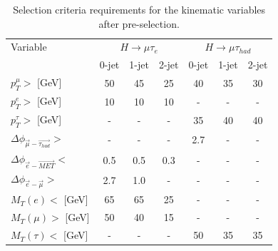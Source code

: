 \begin{table}[hbtp]
 \begin{center}
 \caption{Selection criteria requirements for the kinematic variables after pre-selection.}
  \label{tab:kinematicselection}
  \vspace{0.1in}
  \begin{tabular}{|l|c|c|c|c|c|c|} \hline
Variable                                      & \multicolumn{3}{c|}{$H \to \mu \tau_{e}$}                 &     \multicolumn{3}{c|}{$H \to \mu \tau_{had}$}     \\ \cline{2-7}
                                              &  0-jet        & 1-jet       & 2-jet         &  0-jet         & 1-jet       & 2-jet  \\ \hline \hline
$p^{\mu}_{T}>$ [GeV]                          &     50        &   45        &   25          &  40            & 35          &  30    \\  \hline
$p^{e}_{T}>$   [GeV]                          &     10        &   10        &   10          &   -            &  -          &  -      \\  \hline
$p^{\tau}_{T}>$ [GeV]                         &     -         &    -        &    -          &  35            & 40          &  40    \\  \hline
$\Delta \phi_{\vec{\mu}-\vec{\tau_{had}}}>$   &     -         &    -        &    -          &  2.7           &  -          &  -      \\  \hline
$\Delta \phi_{\vec{e} - \vec{MET}}<$             &    0.5        &   0.5       &   0.3         &    -           &  -          &  -      \\  \hline
$\Delta \phi_{\vec{e} - \vec{\mu}}>$            &    2.7        &   1.0       &    -          &    -           &   -         &  -      \\  \hline    
$M_{T}(e)<$ [GeV]                             &    65         &   65        &   25          &    -           &   -         &  -      \\  \hline    
$M_{T}(\mu)>$ [GeV]                           &    50         &   40        &   15          &    -           &   -         &  -      \\  \hline    
$M_{T}(\tau)<$ [GeV]                          &     -         &    -        &    -           &  50            & 35          &   35   \\   \hline   
  \end{tabular}
 \end{center}
\end{table}


